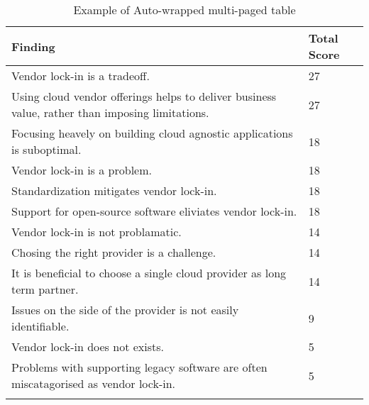 
\renewcommand\arraystretch{1.5}%
\begin{longtable}{|p{10cm}|p{2cm}|}
\hline
\textbf{Finding}  & \textbf{Total Score} \\ \hline
\endhead
Vendor lock-in is a tradeoff. & 27 \\ \hline
Using cloud vendor offerings helps to deliver business value, rather than imposing limitations. & 27 \\ \hline
Focusing heavely on building cloud agnostic applications is suboptimal. & 18 \\ \hline
Vendor lock-in is a problem. & 18 \\ \hline
Standardization mitigates vendor lock-in. & 18 \\ \hline
Support for open-source software eliviates vendor lock-in. & 18 \\ \hline
Vendor lock-in is not problamatic. & 14 \\ \hline
Chosing the right provider is a challenge. & 14 \\ \hline
It is beneficial to choose a single cloud provider as long term partner. & 14 \\ \hline
Issues on the side of the provider is not easily identifiable. & 9 \\ \hline
Vendor lock-in does not exists. & 5 \\ \hline
Problems with supporting legacy software are often miscatagorised as vendor lock-in. & 5 \\ \hline
\caption{Example of Auto-wrapped multi-paged table}
\label{tab:table1}
\end{longtable}
